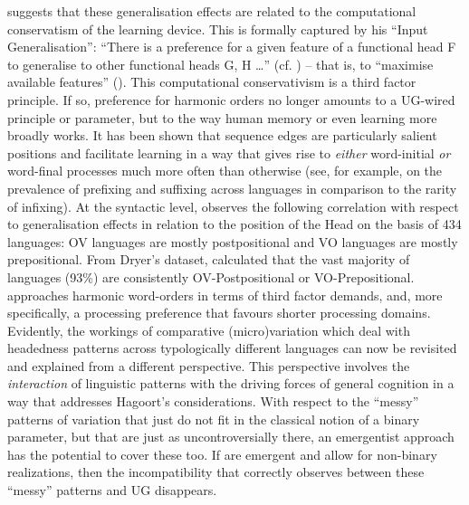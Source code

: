 \documentclass[output=paper]{langsci/langscibook}
\begin{document}
\citet{Roberts2016} suggests that these generalisation effects are related to
the computational conservatism of the learning device. This is formally
captured by his \enquote{Input Generalisation}: “There is a preference for a
given feature of a functional head F to generalise to other functional heads G,
H \dots{}” (cf. \citealt[275]{Roberts2007}) -- that is, to “maximise available
features” (\citealt{BibRob2016b,Roberts2016}). This computational
conservativism is a third factor principle. If so, preference for harmonic
orders no longer amounts to a \gls{UG}-wired principle or parameter, but to the
way human memory or even learning more broadly works. It has been shown that
sequence edges are particularly salient positions and facilitate learning in a
way that gives rise to \emph{either} word-initial \emph{or} word-final
processes much more often than otherwise (see, for example,
\citealt{EndressEtAl2009} on the prevalence of prefixing and suffixing across
languages in comparison to the rarity of infixing). At the syntactic level,
\citet{Dryer1992} observes the following correlation with respect to
generalisation effects in relation to the position of the Head on the basis of
434 languages: OV languages are mostly postpositional and VO languages are
mostly prepositional. From Dryer’s dataset, \citet{Hawkins2010} calculated that
the vast majority of languages (93\%) are consistently OV-Postpositional or
VO-Prepositional. \citet{Hawkins2010} approaches harmonic word-orders in terms
of third factor demands, and, more specifically, a processing preference that
favours shorter processing domains. Evidently, the workings of comparative
(micro)variation which deal with headedness patterns across typologically
different languages can now be revisited and explained from a different
perspective. This perspective involves the \emph{interaction} of linguistic
patterns with the driving forces of general cognition in a way that addresses
Hagoort’s considerations. With respect to the “messy” patterns of variation
that just do not fit in the classical notion of a binary parameter, but that
are just as uncontroversially there, an emergentist approach has the potential
to cover these too. If  are emergent and allow for non-binary
realizations, then the incompatibility that \citet{Yang2004} correctly observes
between these “messy” patterns and \gls{UG} disappears.
\end{document}
